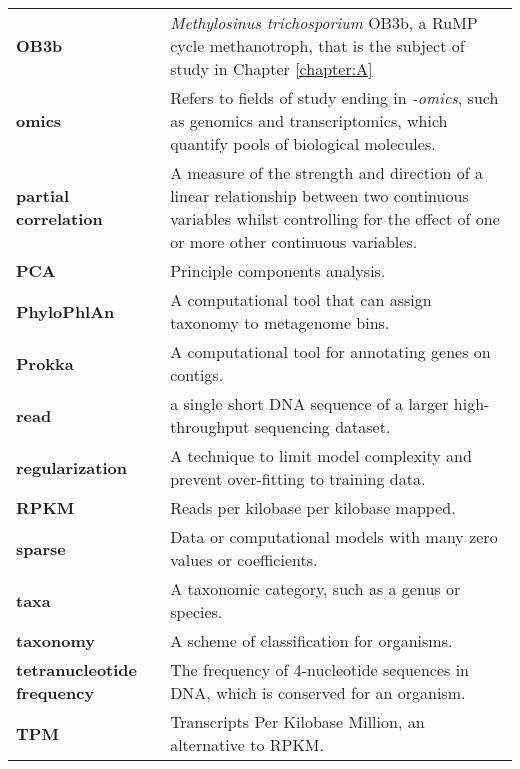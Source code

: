 \begin{singlespace}
\begin{longtable}{ p{}  p{} }
\textbf{OB3b} & \textit{Methylosinus trichosporium} {OB3b}, a RuMP cycle methanotroph, that is the subject of study in Chapter \ref{chapter:A}  \\
\textbf{omics} & Refers to fields of study ending in \textit{-omics}, such as genomics and transcriptomics, which quantify pools of biological molecules. \\
\textbf{partial correlation} & A measure of the strength and direction of a linear relationship between two continuous variables whilst controlling for the effect of one or more other continuous variables. \\
\textbf{PCA} & Principle components analysis. \\
\textbf{PhyloPhlAn} & A computational tool that can assign taxonomy to metagenome bins. \\
\textbf{Prokka} & A computational tool for annotating genes on contigs. \\
\textbf{read} & a single short DNA sequence of a larger high-throughput sequencing dataset. \\
\textbf{regularization} & A technique to limit model complexity and prevent over-fitting to training data. \\
\textbf{RPKM} & Reads per kilobase per kilobase mapped. \\ %
\textbf{sparse} & Data or computational models with many zero values or coefficients. \\
\textbf{taxa} & A taxonomic category, such as a genus or species. \\
\textbf{taxonomy} & A scheme of classification for organisms. \\
\textbf{tetranucleotide frequency} & The frequency of 4-nucleotide sequences in DNA, which is conserved for an organism. \\
\textbf{TPM} & %
	Transcripts Per Kilobase Million, an alternative to RPKM.

\end{longtable}
\end{singlespace}
